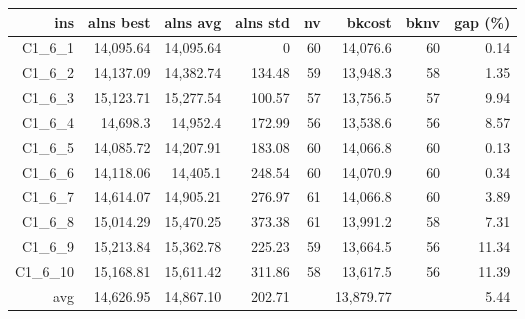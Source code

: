   \begin{table}[caption={Kết quả đo với tập HG\_C\_1\_6 600 yêu cầu}, label=exp:HGC16]
    \small
    \centering
    \begin{tabular}{rrrrrrrr}
    \hline
    ins & alns best & alns avg & alns std & nv & bkcost & bknv & gap (\%) \\ \hline
    C1\_6\_1 & 14,095.64 & 14,095.64 & 0 & 60 & 14,076.6 & 60 & 0.14 \\ \hline
    C1\_6\_2 & 14,137.09 & 14,382.74 & 134.48 & 59 & 13,948.3 & 58 & 1.35 \\ \hline
    C1\_6\_3 & 15,123.71 & 15,277.54 & 100.57 & 57 & 13,756.5 & 57 & 9.94 \\ \hline
    C1\_6\_4 & 14,698.3 & 14,952.4 & 172.99 & 56 & 13,538.6 & 56 & 8.57 \\ \hline
    C1\_6\_5 & 14,085.72 & 14,207.91 & 183.08 & 60 & 14,066.8 & 60 & 0.13 \\ \hline
    C1\_6\_6 & 14,118.06 & 14,405.1 & 248.54 & 60 & 14,070.9 & 60 & 0.34 \\ \hline
    C1\_6\_7 & 14,614.07 & 14,905.21 & 276.97 & 61 & 14,066.8 & 60 & 3.89 \\ \hline
    C1\_6\_8 & 15,014.29 & 15,470.25 & 373.38 & 61 & 13,991.2 & 58 & 7.31 \\ \hline
    C1\_6\_9 & 15,213.84 & 15,362.78 & 225.23 & 59 & 13,664.5 & 56 & 11.34 \\ \hline
    C1\_6\_10 & 15,168.81 & 15,611.42 & 311.86 & 58 & 13,617.5 & 56 & 11.39 \\ \hline
    avg & 14,626.95 & 14,867.10 & 202.71 & & 13,879.77 & & 5.44 \\ \hline
    \end{tabular}
  \end{table}

